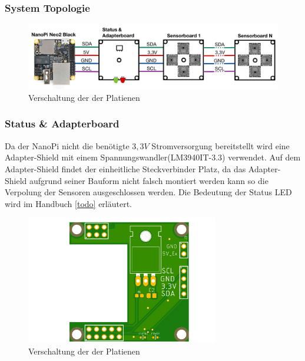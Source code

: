 \subsubsection{System Topologie}
\begin{figure}[H]
\centering
\includegraphics[width=1\textwidth]{img/System-Topologie.png}
\caption{Verschaltung der der Platienen}
\label{fig:Seitenasicht-AS726X}
\end{figure}
\subsubsection{Status \& Adapterboard}
Da der NanoPi nicht die benötigte $3,3V$ Stromversorgung bereitstellt wird eine Adapter-Shield mit einem Spannungswandler(LM3940IT-3.3) verwendet.
Auf dem Adapter-Shield findet der einheitliche Steckverbinder Platz, da das Adapter-Shield aufgrund seiner Bauform nicht falsch montiert werden kann so die Verpolung der Sensoren ausgeschlossen werden.
Die Bedeutung der Status LED wird im Handbuch \ref{todo} erläutert.\\

\begin{figure}[H]
\centering
\includegraphics[width=0.75\textwidth]{img/nanopi-black2-shield}
\caption{Verschaltung der der Platienen}
\label{fig:Seitenasicht-AS726X}
\end{figure}

